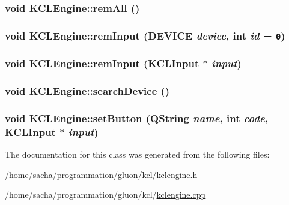 \hypertarget{class_k_c_l_engine_265a2d0e58a5cd9c872c125bd95a47cb}{
\subsubsection[{remAll}]{\setlength{\rightskip}{0pt plus 5cm}void KCLEngine::remAll ()}}
\label{class_k_c_l_engine_265a2d0e58a5cd9c872c125bd95a47cb}


\hypertarget{class_k_c_l_engine_5f138c0986344f0c8bec3f9374e2d122}{
\subsubsection[{remInput}]{\setlength{\rightskip}{0pt plus 5cm}void KCLEngine::remInput ({\bf DEVICE} {\em device}, \/  int {\em id} = {\tt 0})}}
\label{class_k_c_l_engine_5f138c0986344f0c8bec3f9374e2d122}


\hypertarget{class_k_c_l_engine_f5f9dc8d3add7c53c27a9e5bbad7fef3}{
\subsubsection[{remInput}]{\setlength{\rightskip}{0pt plus 5cm}void KCLEngine::remInput ({\bf KCLInput} $\ast$ {\em input})}}
\label{class_k_c_l_engine_f5f9dc8d3add7c53c27a9e5bbad7fef3}


\hypertarget{class_k_c_l_engine_2d77246e1d5c194dd224e2f0e7bff05e}{
\subsubsection[{searchDevice}]{\setlength{\rightskip}{0pt plus 5cm}void KCLEngine::searchDevice ()}}
\label{class_k_c_l_engine_2d77246e1d5c194dd224e2f0e7bff05e}


\hypertarget{class_k_c_l_engine_886715d09ab70063e43ed63022c04345}{
\subsubsection[{setButton}]{\setlength{\rightskip}{0pt plus 5cm}void KCLEngine::setButton (QString {\em name}, \/  int {\em code}, \/  {\bf KCLInput} $\ast$ {\em input})}}
\label{class_k_c_l_engine_886715d09ab70063e43ed63022c04345}




The documentation for this class was generated from the following files:\begin{CompactItemize}
\item 
/home/sacha/programmation/gluon/kcl/\hyperlink{kclengine_8h}{kclengine.h}\item 
/home/sacha/programmation/gluon/kcl/\hyperlink{kclengine_8cpp}{kclengine.cpp}\end{CompactItemize}
